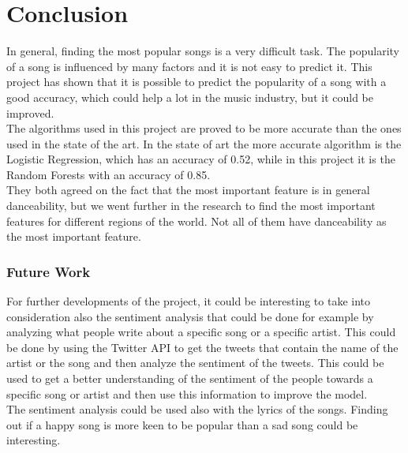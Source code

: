 \chapter{Conclusion}
In general, finding the most popular songs is a very difficult task. The popularity of a song is influenced by many factors and it is not easy to predict it. 
This project has shown that it is possible to predict the popularity of a song with a good accuracy, which could help a lot in the music industry, but it could be improved.\\
The algorithms used in this project are proved to be more accurate than the ones used in the state of the art. In the state of art the more accurate algorithm is the Logistic Regression, which has an accuracy of 0.52, while in this project it is the Random Forests with an accuracy of 0.85.\\
They both agreed on the fact that the most important feature is in general danceability, but we went further in the research to find the most important features for different regions of the world. Not all of them have danceability as the most important feature.\\

\subsection{Future Work}
For further developments of the project, it could be interesting to take into consideration also the sentiment analysis that could be done for example by analyzing what people write about a specific song or a specific artist. This could be done by using the Twitter API to get the tweets that contain the name of the artist or the song and then analyze the sentiment of the tweets. This could be used to get a better understanding of the sentiment of the people towards a specific song or artist and then use this information to improve the model.\\
The sentiment analysis could be used also with the lyrics of the songs. Finding out if a happy song is more keen to be popular than a sad song could be interesting.\\